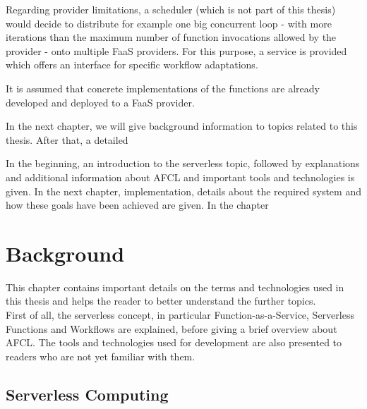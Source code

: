 \documentclass[a4paper,top=25mm,bottom=25mm,12pt,pdftex,halfparskip,twoside,bibtotoc,numbers=noenddot]{scrbook}
\begin{document}
Regarding provider limitations, a scheduler (which is not part of this thesis) would decide to distribute for example one big concurrent loop - with more iterations than the maximum number of function invocations allowed by the provider - onto multiple FaaS providers. For this purpose, a service is provided which offers an interface for specific workflow adaptations.


It is assumed that concrete implementations of the functions are already developed and deployed to a FaaS provider.

In the next chapter, we will give background information to topics related to this thesis. After that, a detailed 

In the beginning, an introduction to the serverless topic, followed by explanations and additional information about AFCL and important tools and technologies is given. In the next chapter, implementation, details about the required system and how these goals have been achieved are given. In the chapter 

\label{chap:background}
\chapter{Background}

This chapter contains important details on the terms and technologies used in this thesis and helps the reader to better understand the further topics.\\
First of all, the serverless concept, in particular Function-as-a-Service, Serverless Functions and Workflows are explained, before giving a brief overview about AFCL. The tools and technologies used for development are also presented to readers who are not yet familiar with them.

\section{Serverless Computing}
\end{document}
